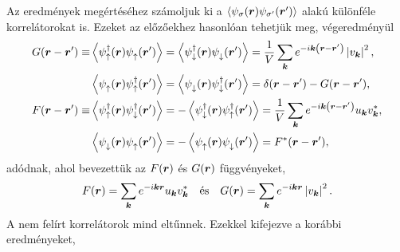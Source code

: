 \documentclass[a4paper,12pt,titlepage]{article}
\newcommand{\KK}{{\vb*{k}}}
\newcommand{\RR}{{\vb*{r}}}
\newcommand{\phantomdagger}{{\phantom{\dagger}}}
\begin{document}
Az eredmények megértéséhez számoljuk ki a $\expval{\psi_\sigma(\RR) \psi_{\sigma^\prime}(\RR^\prime)}$ alakú különféle korrelátorokat is.  Ezeket az előzőekhez hasonlóan tehetjük meg, végeredményül
\begin{equation}
\begin{split} \label{F-G-def}
	G(\RR - \RR^\prime) \equiv & \expval{\psi_\uparrow^\dagger(\RR) \psi_\uparrow^\phantomdagger(\RR^\prime)} = \expval{\psi_\downarrow^\dagger(\RR) \psi_\downarrow^\phantomdagger(\RR^\prime)} = \frac{1}{V} \sum\limits_\KK e^{-i \KK \left( \RR - \RR^\prime \right)} \left| v_\KK \right|^2, \\
	& \expval{\psi_\uparrow^\phantomdagger(\RR) \psi_\uparrow^\dagger(\RR^\prime)} = \expval{\psi_\downarrow^\phantomdagger(\RR) \psi_\downarrow^\dagger(\RR^\prime)} = \delta(\RR - \RR^\prime) - G(\RR - \RR^\prime), \\
	F(\RR - \RR^\prime) \equiv & \expval{\psi_\uparrow^\dagger(\RR) \psi_\downarrow^\dagger(\RR^\prime)} = -\expval{\psi_\downarrow^\dagger(\RR) \psi_\uparrow^\dagger(\RR^\prime)} = \frac{1}{V} \sum\limits_\KK e^{-i \KK \left( \RR - \RR^\prime \right)} u_\KK v_\KK^*, \\
	& \expval{\psi_\downarrow^\phantomdagger(\RR) \psi_\uparrow^\phantomdagger(\RR^\prime)} = -\expval{\psi_\uparrow^\phantomdagger(\RR) \psi_\downarrow^\phantomdagger(\RR^\prime)} = F^*(\RR - \RR^\prime),
\end{split}
\end{equation}
adódnak, ahol bevezettük az $F(\RR)$ és $G(\RR)$ függvényeket,
\begin{equation}
	F(\RR) = \sum\limits_\KK e^{-i \KK \RR} u_\KK v_\KK^* ~~~ \text{és} ~~~ G(\RR) = \sum\limits_\KK e^{-i \KK \RR} \left| v_\KK \right|^2.
\end{equation}
A nem felírt korrelátorok mind eltűnnek.  Ezekkel kifejezve a korábbi eredményeket,
\end{document}
